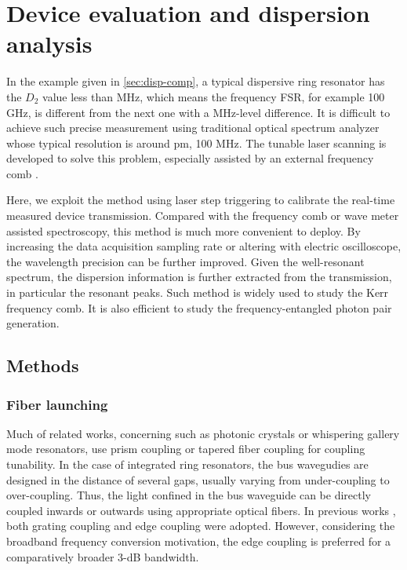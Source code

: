 
\chapter{Device evaluation and dispersion analysis}%


In the example given in \autoref{sec:disp-comp},  a typical dispersive ring resonator has the $ D_2 $ value less than MHz, which means the frequency FSR, for example 100 GHz, is different from the next one with a MHz-level difference. It is difficult to achieve such precise measurement using traditional optical spectrum analyzer whose typical resolution is around pm, 100 MHz. The tunable laser scanning is developed to solve this problem, especially assisted by an external frequency comb \cite{Liu2016d}. 

Here, we exploit the method using laser step triggering to calibrate the real-time measured device transmission. Compared with the frequency comb or wave meter assisted spectroscopy, this method is much more convenient to deploy. By increasing the data acquisition sampling rate or altering with electric oscilloscope, the wavelength precision can be further improved.
Given the well-resonant spectrum, the dispersion information is further extracted from the transmission, in particular the resonant peaks. Such method is widely used to study the Kerr frequency comb. It is also efficient to study the frequency-entangled photon pair generation.


\section{Methods}

\subsection{Fiber launching}
Much of related works, concerning such as photonic crystals or whispering gallery mode resonators, use prism coupling or tapered fiber coupling for coupling tunability. 
In the case of integrated ring resonators, the bus wavegudies are designed in the distance of several gaps, usually varying from under-coupling to over-coupling. 
Thus, the light confined in the bus waveguide can be directly coupled inwards or outwards using appropriate optical fibers. 
In previous works \cite{Sunada2018}, both grating coupling and edge coupling were adopted. However, considering the broadband frequency conversion motivation, the edge coupling is preferred for a comparatively broader 3-dB bandwidth. 

